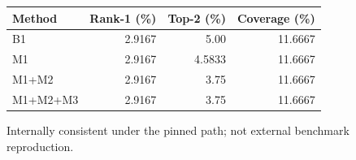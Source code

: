 \begin{table}[t]
\centering
\small
\begin{tabular}{lrrr}
\toprule
Method & Rank-1 (\%) & Top-2 (\%) & Coverage (\%) \\
\midrule
B1 & 2.9167 & 5.00 & 11.6667 \\
M1 & 2.9167 & 4.5833 & 11.6667 \\
M1+M2 & 2.9167 & 3.75 & 11.6667 \\
M1+M2+M3 & 2.9167 & 3.75 & 11.6667 \\
\bottomrule
\end{tabular}
\parbox{\linewidth}{\footnotesize Internally consistent under the pinned path; not external benchmark reproduction.}
\end{table}
